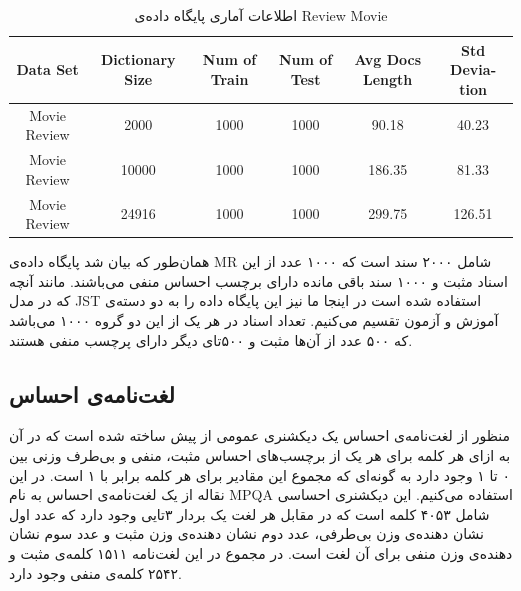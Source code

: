\documentclass[12pt,a4paper]{article}
\begin{document}
\begin{table}[!t]
	\footnotesize
	\centering
	\begin{latin}
		\begin{tabular}{|c|c|c|c|c|c|}
			\hline
			Data Set & Dictionary Size & Num of Train & Num of Test & Avg Docs Length & Std Deviation \\
			\hline
			Movie Review & 2000 & 1000 & 1000 & 90.18 & 40.23 \\
			\hline
			Movie Review & 10000 &1000 & 1000 & 186.35 & 81.33 \\
			\hline
			Movie Review & 24916 &1000 & 1000 & 299.75 & 126.51 \\
			\hline
		\end{tabular}
	\end{latin}
	\caption{اطلاعات آماری پایگاه داده‌ی Review Movie}
	\label{tb2}
\end{table}
همان‌طور که بیان شد پایگاه داده‌ی MR شامل ۲۰۰۰ سند است که ۱۰۰۰ عدد از این اسناد مثبت و ۱۰۰۰ سند باقی‌ مانده دارای برچسب احساس منفی‌ می‌‌باشند. مانند آنچه که در مدل JST استفاده شده است در اینجا ما نیز این پایگاه داده را به دو دسته‌ی آموزش و آزمون تقسیم می‌‌کنیم. تعداد اسناد در هر یک از این دو گروه ۱۰۰۰ می‌‌باشد که ۵۰۰ عدد از آن‌ها مثبت و ۵۰۰تای دیگر دارای پرچسب منفی‌ هستند.

\subsection{لغت‌نامه‌ی احساس}
\label{sec4-3}
منظور از لغت‌نامه‌ی احساس یک دیکشنری عمومی‌ از پیش ساخته شده است که در آن به ازای هر کلمه برای هر یک از برچسب‌های احساس مثبت، منفی‌ و بی‌طرف وزنی بین ۰ تا ۱ وجود دارد به گونه‌ای که مجموع این مقادیر برای هر کلمه برابر با ۱ است. در این نقاله از یک لغت‌نامه‌ی احساس به نام MPQA استفاده می‌‌کنیم. این دیکشنری احساسی‌ شامل ۴۰۵۳ کلمه است که در مقابل هر لغت یک بردار ۳تایی‌ وجود دارد که عدد اول نشان دهنده‌ی وزن بی‌طرفی، عدد دوم نشان دهنده‌ی وزن مثبت و عدد سوم نشان دهنده‌ی وزن منفی‌ برای آن لغت است. در مجموع در این لغت‌نامه ۱۵۱۱ کلمه‌ی مثبت و ۲۵۴۲ کلمه‌ی منفی‌ وجود دارد.
\end{document}
